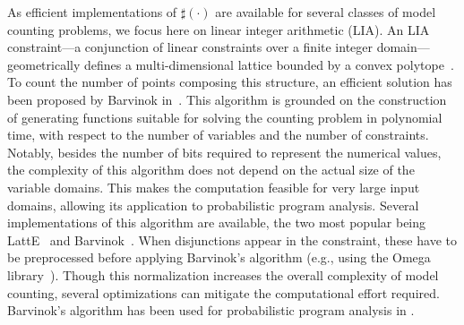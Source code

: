 As efficient implementations of $\sharp(\cdot)$ are available for several classes of model counting problems, we focus here on linear integer arithmetic (LIA).
An LIA constraint---a conjunction of linear constraints over a finite integer domain---geometrically defines a multi-dimensional lattice bounded by a convex polytope~\cite{de2008computationalGeometry}. To count the number of points composing this structure, an efficient solution has been proposed by Barvinok in~\cite{barvinok1994polynomial}. This algorithm is grounded on the construction of generating functions suitable for solving the counting problem in polynomial time, with respect to the number of variables and the number of constraints. Notably, besides the number of bits required to represent the numerical values, the complexity of this algorithm does not depend on the actual size of the variable domains. This makes the computation feasible for very large input domains, allowing its application to probabilistic program analysis. Several implementations of this algorithm are available, the two most popular being LattE~\cite{LattESoftware} and Barvinok~\cite{verdoolaegesoftware}. When disjunctions appear in the constraint, these have to be preprocessed before applying Barvinok's algorithm (e.g., using the Omega library~\cite{Omega1996}). Though this normalization increases the overall complexity of model counting, several optimizations can mitigate the computational effort required.
Barvinok's algorithm has been used for probabilistic program analysis in \cite{Geldenhuys2012,Filieri2013,Filieri2015}.


